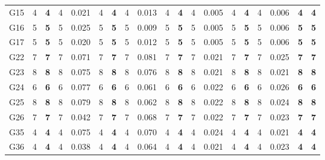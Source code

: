 \documentclass[12pt, a4paper]{article}%
\numberwithin{equation}{section}
\theoremstyle{plain}
\begin{document}
{\begin{landscape}
\begin{longtable}{lllllllllllllllllll}
						G15                       & 4    & \textbf{4}  & 4   & 0.021 & 4    & \textbf{4}  & 4   & 0.013 & 4    & \textbf{4}  & 4   & 0.005 & 4    & \textbf{4}  & 4   & 0.006 & \textbf{4}              & \textbf{4}           \\
						G16                       & 5    & \textbf{5}  & 5   & 0.025 & 5    & \textbf{5}  & 5   & 0.009 & 5    & \textbf{5}  & 5   & 0.005 & 5    & \textbf{5}  & 5   & 0.006 & \textbf{5}              & \textbf{5}           \\
						G17                       & 5    & \textbf{5}  & 5   & 0.020 & 5    & \textbf{5}  & 5   & 0.012 & 5    & \textbf{5}  & 5   & 0.005 & 5    & \textbf{5}  & 5   & 0.006 & \textbf{5}              & \textbf{5}           \\
						G22                       & 7    & \textbf{7}  & 7   & 0.071 & 7    & \textbf{7}  & 7   & 0.081 & 7    & \textbf{7}  & 7   & 0.021 & 7    & \textbf{7}  & 7   & 0.025 & \textbf{7}              & \textbf{7}           \\
						G23                       & 8    & \textbf{8}  & 8   & 0.075 & 8    & \textbf{8}  & 8   & 0.076 & 8    & \textbf{8}  & 8   & 0.021 & 8    & \textbf{8}  & 8   & 0.021 & \textbf{8}              & \textbf{8}           \\
						G24                       & 6    & \textbf{6}  & 6   & 0.077 & 6    & \textbf{6}  & 6   & 0.061 & 6    & \textbf{6}  & 6   & 0.022 & 6    & \textbf{6}  & 6   & 0.026 & \textbf{6}              & \textbf{6}           \\
						G25                       & 8    & \textbf{8}  & 8   & 0.079 & 8    & \textbf{8}  & 8   & 0.062 & 8    & \textbf{8}  & 8   & 0.022 & 8    & \textbf{8}  & 8   & 0.024 & \textbf{8}              & \textbf{8}           \\
						G26                       & 7    & \textbf{7}  & 7   & 0.042 & 7    & \textbf{7}  & 7   & 0.068 & 7    & \textbf{7}  & 7   & 0.022 & 7    & \textbf{7}  & 7   & 0.023 & \textbf{7}              & \textbf{7}           \\
						G35                       & 4    & \textbf{4}  & 4   & 0.075 & 4    & \textbf{4}  & 4   & 0.070 & 4    & \textbf{4}  & 4   & 0.024 & 4    & \textbf{4}  & 4   & 0.021 & \textbf{4}              & \textbf{4}           \\
						G36                       & 4    & \textbf{4}  & 4   & 0.038 & 4    & \textbf{4}  & 4   & 0.064 & 4    & \textbf{4}  & 4   & 0.021 & 4    & \textbf{4}  & 4   & 0.023 & \textbf{4}              & \textbf{4}           \\

\end{longtable}
\end{landscape}}
\end{document}
